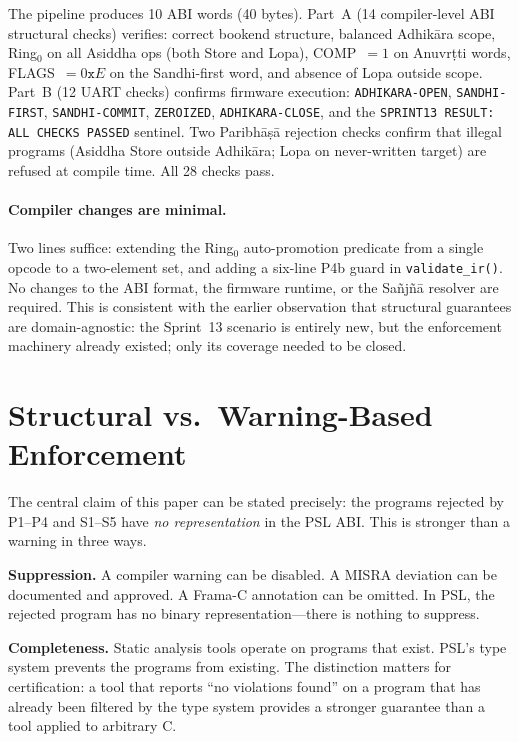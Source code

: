 \documentclass[11pt,a4paper]{article}
\begin{document}
The pipeline produces 10 ABI words (40 bytes). Part~A (14 compiler-level ABI
structural checks) verifies: correct bookend structure, balanced
Adhi\-k\={a}ra scope, Ring$_0$ on all Asiddha ops (both Store and Lopa),
COMP~$= 1$ on Anuvr\d{t}ti words, FLAGS~$= 0\texttt{x}E$ on the Sandhi-first
word, and absence of Lopa outside scope. Part~B (12 UART checks) confirms
firmware execution: \texttt{ADHIKARA-OPEN}, \texttt{SANDHI-FIRST},
\texttt{SANDHI-COMMIT}, \texttt{ZEROIZED}, \texttt{ADHIKARA-CLOSE}, and the
\texttt{SPRINT13 RESULT: ALL CHECKS PASSED} sentinel. Two Paribh\={a}\d{s}\={a}
rejection checks confirm that illegal programs (Asiddha Store outside
Adhi\-k\={a}ra; Lopa on never-written target) are refused at compile time. All
28 checks pass.

\paragraph{Compiler changes are minimal.}
Two lines suffice: extending the Ring$_0$ auto-promotion predicate from a
single opcode to a two-element set, and adding a six-line P4b guard in
\texttt{vali\-date\_ir()}. No changes to the ABI format, the firmware runtime,
or the Sa\~{n}j\~{n}\={a} resolver are required. This is consistent with the
earlier observation that structural guarantees are domain-agnostic: the
Sprint~13 scenario is entirely new, but the enforcement machinery already
existed; only its coverage needed to be closed.

\section{Structural vs.\ Warning-Based Enforcement}
\label{sec:structural}

The central claim of this paper can be stated precisely: the programs rejected
by P1--P4 and S1--S5 have \emph{no representation} in the PSL ABI. This is
stronger than a warning in three ways.

\textbf{Suppression.} A compiler warning can be disabled. A MISRA deviation
can be documented and approved. A Frama-C annotation can be omitted. In PSL,
the rejected program has no binary representation---there is nothing to
suppress.

\textbf{Completeness.} Static analysis tools operate on programs that exist.
PSL's type system prevents the programs from existing. The distinction matters
for certification: a tool that reports ``no violations found'' on a program
that has already been filtered by the type system provides a stronger guarantee
than a tool applied to arbitrary C.
\end{document}
